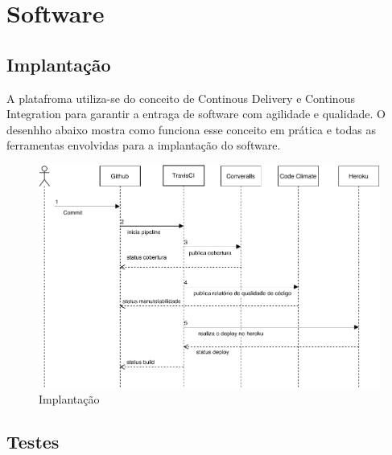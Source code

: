 \chapter{Software} \label{cha:software}

\section{Implantação} \label{sec:software:implantacao}

A platafroma utiliza-se do conceito de Continous Delivery e Continous Integration para garantir 
a entraga de software com agilidade e qualidade. O desenhho abaixo mostra como funciona esse conceito 
em prática e todas as ferramentas envolvidas para a implantação do software.

\begin{figure}[H]
  \caption{\label{fig:desenho implantacao}Implantação}
  \centering
  \includegraphics[scale=0.7]{imagens/delivery.pdf}
\end{figure}


\section{Testes} \label{sec:software:testes}